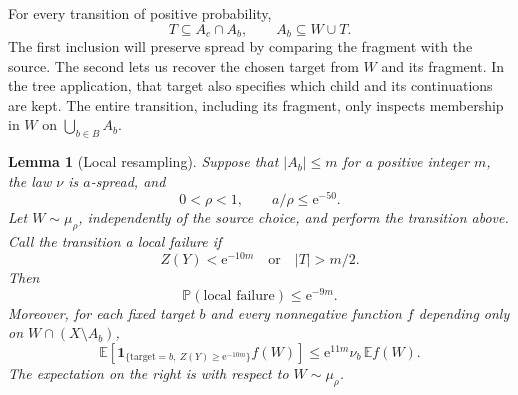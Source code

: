 \documentclass[11pt]{article}
\newtheorem{lemma}[theorem]{Lemma}
\numberwithin{equation}{section}
\newcommand{\PP}{\mathbb P}
\newcommand{\EE}{\mathbb E}
\newcommand{\ind}{\mathbf 1}
\newcommand{\ee}{\mathrm e}
\begin{document}
For every transition of positive probability,
\begin{equation}\label{eq:two-inclusions}
 T\subseteq A_c\cap A_b,
 \qquad A_b\subseteq W\cup T.
\end{equation}
The first inclusion will preserve spread by comparing the fragment
with the source. The second lets us recover the chosen target from
$W$ and its fragment. In the tree application, that target also
specifies which child and its continuations are kept.
The entire transition, including its fragment, only inspects
membership in $W$ on $\bigcup_{b\in B}A_b$.

\begin{lemma}[Local resampling]\label{lem:local}
Suppose that $|A_b|\le m$ for a positive integer $m$, the law $\nu$
is $a$-spread, and
\[
 0<\rho<1,\qquad a/\rho\le\ee^{-50}.
\]
Let $W\sim\mu_\rho$, independently of the source choice, and perform
the transition above. Call the transition a \emph{local failure} if
\[
 Z(Y)<\ee^{-10m}\quad\text{or}\quad |T|>m/2.
\]
Then
\begin{equation}\label{eq:local-failure}
 \PP(\text{local failure})\le\ee^{-9m}.
\end{equation}
Moreover, for each fixed target $b$ and every nonnegative function
$f$ depending only on $W\cap(X\setminus A_b)$,
\begin{equation}\label{eq:distortion}
 \EE\!\left[
  \ind_{\{\mathrm{target}=b,\ Z(Y)\ge\ee^{-10m}\}} f(W)
 \right]
 \le \ee^{11m}\nu_b\,\EE f(W).
\end{equation}
The expectation on the right is with respect to $W\sim\mu_\rho$.
\end{lemma}
\end{document}
